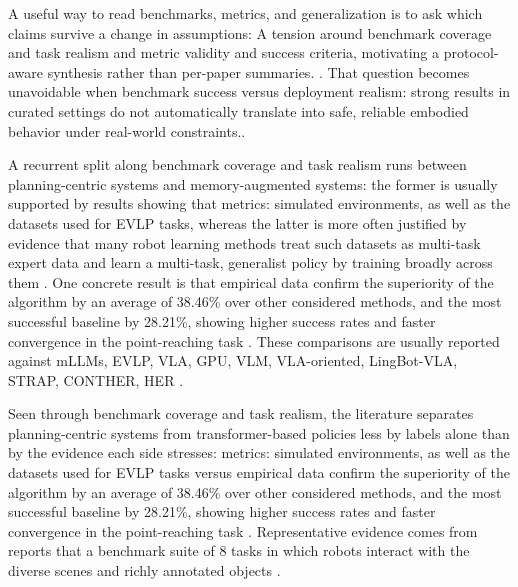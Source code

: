 \documentclass[a4paper,11pt]{article}
\begin{document}
A useful way to read benchmarks, metrics, and generalization is to ask which claims survive a change in assumptions: A tension around benchmark coverage and task realism and metric validity and success criteria, motivating a protocol-aware synthesis rather than per-paper summaries. \citep{Liu2026Adaptation,Liu2026World,Maddukuri2025Real,Moroncelli2024Duality}. That question becomes unavoidable when benchmark success versus deployment realism: strong results in curated settings do not automatically translate into safe, reliable embodied behavior under real-world constraints..

A recurrent split along benchmark coverage and task realism runs between planning-centric systems and memory-augmented systems: the former is usually supported by results showing that metrics: simulated environments, as well as the datasets used for EVLP tasks, whereas the latter is more often justified by evidence that many robot learning methods treat such datasets as multi-task expert data and learn a multi-task, generalist policy by training broadly across them \citep{Francis2021Core,Francis2023Core,Memmel2024Strap}. One concrete result is that empirical data confirm the superiority of the algorithm by an average of 38.46\% over other considered methods, and the most successful baseline by 28.21\%, showing higher success rates and faster convergence in the point-reaching task \citep{Makarova2025Conther}. These comparisons are usually reported against mLLMs, EVLP, VLA, GPU, VLM, VLA-oriented, LingBot-VLA, STRAP, CONTHER, HER \citep{Mei2026Video,Zheng2025Multimodal,Francis2023Core,Francis2021Core}.

Seen through benchmark coverage and task realism, the literature separates planning-centric systems from transformer-based policies less by labels alone than by the evidence each side stresses: metrics: simulated environments, as well as the datasets used for EVLP tasks versus empirical data confirm the superiority of the algorithm by an average of 38.46\% over other considered methods, and the most successful baseline by 28.21\%, showing higher success rates and faster convergence in the point-reaching task \citep{Francis2021Core,Francis2023Core,Makarova2025Conther}. Representative evidence comes from reports that a benchmark suite of 8 tasks in which robots interact with the diverse scenes and richly annotated objects \citep{Kim2026Molmospaces}.
\end{document}
